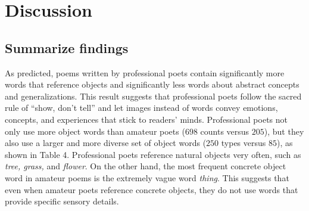 \documentclass{book}
\begin{document}
\begin{figure}
\end{figure}
\section{Discussion}
\subsection{Summarize findings}
As predicted, poems written by professional poets contain significantly more words that reference objects and significantly less words about abstract concepts and generalizations. This result suggests that professional poets follow the sacred rule of ``show, don't tell'' and let images instead of words convey emotions, concepts, and experiences that stick to readers' minds. Professional poets not only use more object words than amateur poets ($698$ counts versus $205$), but they also use a larger and more diverse set of object words ($250$ types versus $85$), as shown in Table 4. Professional poets reference natural objects very often, such as \emph{tree, grass,} and \emph{flower}. On the other hand, the most frequent concrete object word in amateur poems is the extremely vague word \emph{thing}. This suggests that even when amateur poets reference concrete objects, they do not use words that provide specific sensory details.
\end{document}

